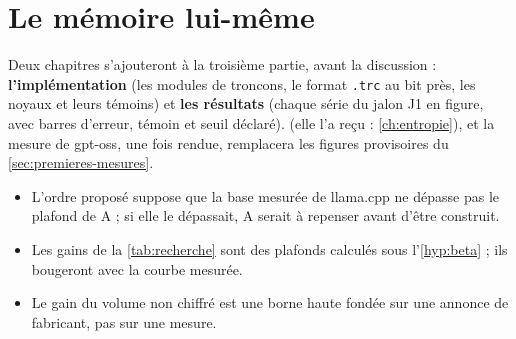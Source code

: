 \section{Le mémoire lui-même}\label{sec:memoire-suite}

Deux chapitres s'ajouteront à la troisième partie, avant la discussion : \textbf{l'implémentation} (les modules de troncons, le format \texttt{.trc} au bit près, les noyaux et leurs témoins) et \textbf{les résultats} (chaque série du jalon J1 en figure, avec barres d'erreur, témoin et seuil déclaré).  (elle l'a reçu : \cref{ch:entropie}), et la mesure de gpt-oss, une fois rendue, remplacera les figures provisoires du \cref{sec:premieres-mesures}.

\begin{faux}
\begin{itemize}
\item L'ordre proposé suppose que la base mesurée de llama.cpp ne dépasse pas le plafond de A ; si elle le dépassait, A serait à repenser avant d'être construit.
\item Les gains de la \cref{tab:recherche} sont des plafonds calculés sous l'\cref{hyp:beta} ; ils bougeront avec la courbe mesurée.
\item Le gain du volume non chiffré est une borne haute fondée sur une annonce de fabricant, pas sur une mesure.
\end{itemize}
\end{faux}

